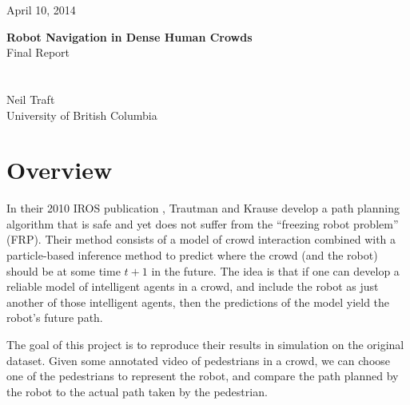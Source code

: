 \documentclass[a4paper,11pt,headings=small]{article}
\begin{document}
  \vspace{-1cm}
	\begin{flushright}
	April 10, 2014\\
	\end{flushright}
	\vspace{0.6cm}
	\LARGE{\textbf{Robot Navigation in Dense Human Crowds}\\[0.2cm] Final Report}\\\\ \\
	\large{Neil Traft\\[0.1cm] University of British Columbia}		 	 	\vspace{0.6cm}


\pagestyle{fancy}
\fancyhf{}

\setcounter{page}{1}

\renewcommand{\thesection}{\Roman{section}}
\thispagestyle{empty}

\newcommand{\f}{\mathbf{f}}
\newcommand{\fr}{\f^{(R)}}
\newcommand{\fati}{\f^{(i)}}
\newcommand{\fatj}{\f^{(j)}}
\newcommand{\samplej}{(\fatj)_i}
\newcommand{\z}{\mathbf{z}}
\newcommand{\ztot}{\z_{1:t}}
\newcommand{\pos}{\mathrm{pos}}
\newcommand{\post}{\pos^{(i)}_t}

\section*{Overview}
\quad In their 2010 IROS publication \cite{Trautman2010}, Trautman and Krause develop a path planning algorithm that is safe and yet does not suffer from the ``freezing robot problem'' (FRP). Their method consists of a model of crowd interaction combined with a particle-based inference method to predict where the crowd (and the robot) should be at some time $t+1$ in the future. The idea is that if one can develop a reliable model of intelligent agents in a crowd, and include the robot as just another of those intelligent agents, then the predictions of the model yield the robot's future path.

The goal of this project is to reproduce their results in simulation on the original dataset. Given some annotated video of pedestrians in a crowd, we can choose one of the pedestrians to represent the robot, and compare the path planned by the robot to the actual path taken by the pedestrian.
\end{document}
